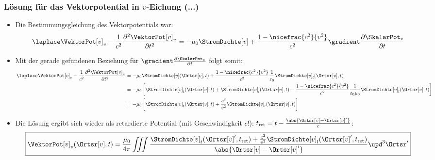 \begin{frame}
  \frametitle{Lösung für das Vektorpotential in $v$-Eichung (...)}
  \begin{itemize}[<+->]
  \item Die Bestimmungsgleichung des Vektorpotentials war:
    \begin{equation*}
      \laplace\VektorPot[v]_v -\frac{1}{c^2}\frac{\partial^2\VektorPot[v]_v}{\partial t^2} = -\mu_0\StromDichte[v] + \frac{1-\nicefrac{c^2}{v^2}}{c^2} \gradient\frac{\partial \SkalarPot_v}{\partial t}
      \end{equation*}
    \item Mit der gerade gefundenen Beziehung für $\gradient\frac{\partial \SkalarPot_v}{\partial t}$ folgt somit:
      \begin{equation}
        \begin{aligned}
          \laplace\VektorPot[v]_v -\frac{1}{c^2}\frac{\partial^2\VektorPot[v]_v}{\partial t^2} &= -\mu_0\StromDichte[v](\Ortsr[v], t) + \frac{1-\nicefrac{c^2}{v^2}}{c^2}\frac{1}{\varepsilon_0} \StromDichte[v]_l(\Ortsr[v], t)\\
          &=-\mu_0\left[ \StromDichte[v]_t(\Ortsr[v], t) + \StromDichte[v]_l(\Ortsr[v], t) - \frac{1-\nicefrac{c^2}{v^2}}{c^2}\frac{1}{\varepsilon_0\mu_0} \StromDichte[v]_l(\Ortsr[v], t) \right]\\
          &= -\mu_0\left[ \StromDichte[v]_t(\Ortsr[v], t) + \frac{c^2}{v^2} \StromDichte[v]_l(\Ortsr[v], t)\right]
          \end{aligned}
        \end{equation}
      \item Die Lösung ergibt sich wieder als retardierte Potential (mit Geschwindigkeit $c$!): $t_{\text{ret}} = t - \frac{\abs{\Ortsr[v]-\Ortsr[v]^\prime}}{c}$:
        \begin{equation}
          \boxed{%
          \VektorPot[v]_v(\Ortsr[v], t) = \frac{\mu_0}{4\pi} \iiint \frac{\StromDichte[v]_t (\Ortsr[v]^\prime, t_{\text{ret}}) +\frac{c^2}{v^2} \StromDichte[v]_l (\Ortsr[v]^\prime, t_{\text{ret}})}{\abs{\Ortsr[v]-\Ortsr[v]^\prime}} \upd^3\Ortsr^\prime}
          \end{equation}
  \end{itemize}
\end{frame}
    

